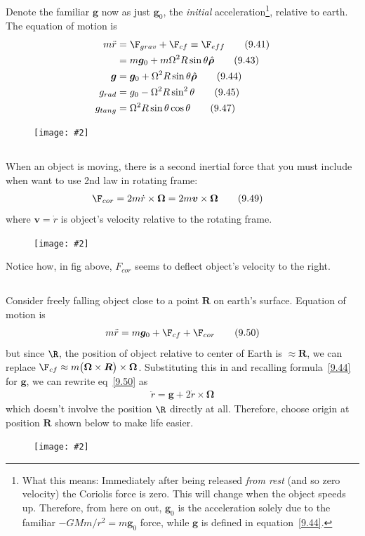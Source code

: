 \documentclass[10pt, twocolumn]{article}
\newcommand\myfig[2][0.3\textwidth]{\begin{figure}[h!]\centering\texttt{[image: \#2]}\end{figure}}
\newcommand{\myspace}{\vspace{3\bigskipamount}}
\newcommand\p{\Needspace{10\baselineskip} \noindent}
\newcommand{\rdot}{\dot{r}}
\newcommand{\rddot}{\ddot{r}}
\newcommand\tlab[1]{\tag{#1}\label{#1}}
\begin{document}
\p Denote the familiar $\bm{g}$ now as just $\bm{g}_0$, the \textit{initial} acceleration\footnote{What this means: Immediately after being released \emph{from rest} (and so zero velocity) the Coriolis force is zero. This will change when the object speeds up. Therefore, from here on out, $\bm{g}_0$ is the acceleration solely due to the familiar $-GMm/r^2 = m\bm{g}_0$ force, while $\bm{g}$ is defined in equation~\ref{9.44}.}, relative to earth. The equation of motion is
\begin{align}
	m\rddot &= \F_{grav} + \F_{cf} \equiv \F_{eff} \tlab{9.41} \\
	&= m\bm{g}_0 + m\Omega^2 R \sin\theta \hat{\bm{\rho}} \tlab{9.43} \\
	\bm{g} &= \bm{g}_0 + \Omega^2 R \sin\theta \hat{\bm{\rho}} \tlab{9.44}  \\
	g_{rad} &= g_0 - \Omega^2 R \sin^2\theta \tlab{9.45} \\
	g_{tang} &= \Omega^2 R \sin\theta\cos\theta \tlab{9.47} 
\end{align}
\myfig{FreeFall.PNG}
\myspace 

\subsection{}

\p When an object is moving, there is a second inertial force that you must include when want to use 2nd law in rotating frame:
\begin{align}
\F_{cor} &= 2m\rdot \times \bm{\Omega} = 2m\bm{v} \times \bm{\Omega}  \tlab{9.49} 
\end{align}
where $\bm{v} = \rdot$ is object's velocity relative to the rotating frame. 
\myfig{Coriolis.PNG}

\p Notice how, in fig above, $F_{cor}$ seems to deflect object's velocity to the right. 

\subsection{} 

\p Consider freely falling object close to a point $\bm{R}$ on earth's surface. Equation of motion is 
\begin{align}
	m\rddot = m\bm{g}_0 + \F_{cf} + \F_{cor} \tlab{9.50}
\end{align}
but since $\R$, the position of object relative to center of Earth is $\approx \bm{R}$, we can replace $\F_{cf} \approx m \big(\bm{\Omega} \times \bm{R} \big) \times \bm{\Omega}$. Substituting this in and recalling formula~\ref{9.44} for $\bm{g}$, we can rewrite eq~\ref{9.50} as
\begin{align}
	\rddot = \bm{g} + 2\rdot \times \bm{\Omega} \tlab{9.51}
\end{align}
which doesn't involve the position $\R$ directly at all. Therefore, choose origin at position $\bm{R}$ shown below to make life easier.
\myfig{NewR.PNG}
\end{document}
